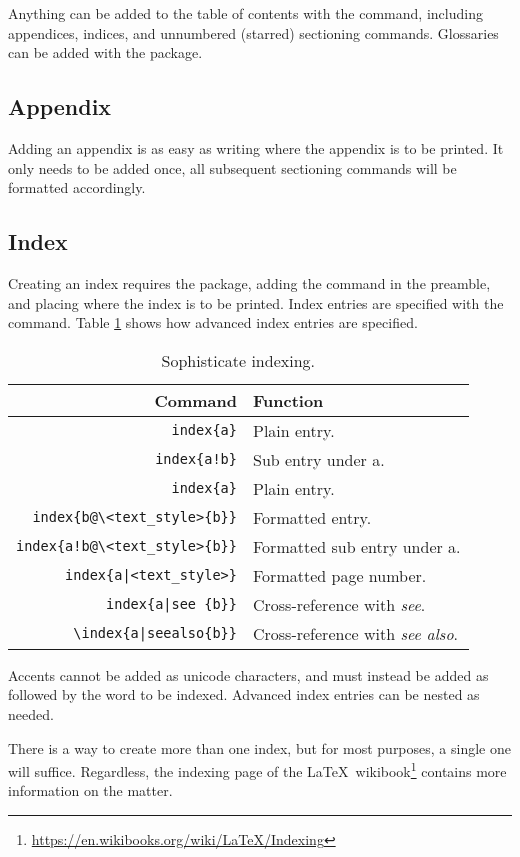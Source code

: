 Anything can be added to the table of contents with the
 command, including appendices, indices,
and unnumbered (starred) sectioning commands.  Glossaries can be added
with the  package.
%
\subsection{Appendix}
%
Adding an appendix is as easy as writing  where the
appendix is to be printed.  It only needs to be added once, all
subsequent sectioning commands will be formatted accordingly.
%
\subsection{Index}
%
Creating an index requires the  package, adding the
 command in the preamble, and placing
 where the index is to be printed.  Index entries
are specified with the  command.  Table \ref{t:index}
shows how advanced index entries are specified.
\begin{table}[!htbp]
  \centering
  \caption{Sophisticate indexing.}
  \label{t:index}
  \begin{tabular}{rl}
    \toprule
    Command & Function \\
    \midrule
    \verb|index{a}| & Plain entry. \\
    \verb|index{a!b}| & Sub entry under a. \\
    \verb|index{a}| & Plain entry. \\
    \verb|index{b@\<text_style>{b}}| & Formatted entry. \\
    \verb|index{a!b@\<text_style>{b}}| & Formatted sub entry under a. \\
    \verb+index{a|<text_style>}+ & Formatted page number. \\
    \verb+index{a|see {b}}+ & Cross-reference with \emph{see}. \\
    \verb+\index{a|seealso{b}}+ & Cross-reference with \emph{see also}.\\
    \bottomrule
  \end{tabular}
\end{table}
Accents cannot be added as unicode characters, and must instead be
added as  followed by the word to be indexed.
Advanced index entries can be nested as needed.

There is a way to create more than one index, but for most purposes, a
single one will suffice.  Regardless, the indexing page of the
\LaTeX~wikibook\footnote{\url{https://en.wikibooks.org/wiki/LaTeX/Indexing}}
contains more information on the matter.
%
